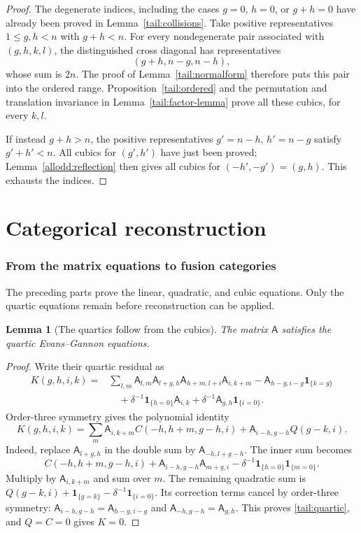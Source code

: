 \documentclass[11pt]{article}
\numberwithin{equation}{section}
\newtheorem{lemma}[theorem]{Lemma}
\theoremstyle{definition}
\theoremstyle{remark}
\newcommand{\ind}[1]{\mathbf1_{\{#1\}}}
\begin{document}
\begin{proof}
The degenerate indices, including the cases $g=0$, $h=0$, or $g+h=0$ have
already been proved in Lemma~\ref{tail:collisions}.
Take positive representatives $1\le g,h<n$ with $g+h<n$.
For every nondegenerate pair associated with $(g,h,k,l)$, the
distinguished cross diagonal has representatives
\[
 (g+h,n-g,n-h),
\]
whose sum is $2n$.  The proof of Lemma~\ref{tail:normalform}
therefore puts this pair into the ordered range.  Proposition~\ref{tail:ordered} and
the permutation and translation invariance in
Lemma~\ref{tail:factor-lemma} prove all these cubics, for every $k,l$.

If instead $g+h>n$, the positive representatives
$g'=n-h$, $h'=n-g$ satisfy $g'+h'<n$.  All cubics for $(g',h')$
have just been proved; Lemma~\ref{allodd:reflection} then gives
all cubics for $(-h',-g')=(g,h)$.  This exhausts the indices.
\end{proof}



\part{Categorical reconstruction}
\label{part:reconstruction}
\section{From the matrix equations to fusion categories}
\label{tail:reconstruction}

The preceding parts prove the linear, quadratic, and cubic equations.
Only the quartic equations remain before reconstruction can be applied.

\begin{lemma}[The quartics follow from the cubics]\label{tail:quartic-lemma}
The matrix $\mathsf A$ satisfies the quartic Evans--Gannon equations.
\end{lemma}

\begin{proof}
Write their quartic residual as
\begin{align*}
 K(g,h,i,k)={}&\sum_{l,m}\mathsf A_{l,m}\mathsf A_{l+g,h}
                  \mathsf A_{h+m,l+i}\mathsf A_{i,k+m}
       -\mathsf A_{h-g,i-g}\ind{k=g}\\
 &\quad+\delta^{-1}\ind{h=0}\mathsf A_{i,k}
       +\delta^{-1}\mathsf A_{g,h}\ind{i=0}.
\end{align*}
Order-three symmetry gives the polynomial identity
\begin{equation}\label{tail:quartic}
 K(g,h,i,k)=\sum_m\mathsf A_{i,k+m}C(-h,h+m,g-h,i)
             +\mathsf A_{i-h,g-h}Q(g-k,i).
\end{equation}
Indeed, replace $\mathsf A_{l+g,h}$ in the double sum by
$\mathsf A_{-h,l+g-h}$. The inner sum becomes
\[
 C(-h,h+m,g-h,i)+\mathsf A_{i-h,g-h}\mathsf A_{m+g,i}
                  -\delta^{-1}\ind{h=0}\ind{m=0}.
\]
Multiply by $\mathsf A_{i,k+m}$ and sum over $m$.
The remaining quadratic sum is
$Q(g-k,i)+\ind{g=k}-\delta^{-1}\ind{i=0}$.
Its correction terms cancel by order-three symmetry:
$\mathsf A_{i-h,g-h}=\mathsf A_{h-g,i-g}$ and
$\mathsf A_{-h,g-h}=\mathsf A_{g,h}$.
This proves \eqref{tail:quartic}, and $Q=C=0$ gives $K=0$.
\end{proof}
\end{document}
